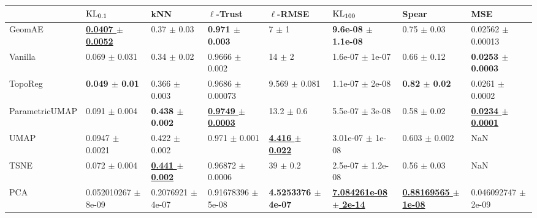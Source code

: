 \begin{tabular}{llllllll}
\toprule
{} &                               $\operatorname{KL}_{0.1}$ &                                      kNN &                               $\ell$-Trust &                              $\ell$-RMSE &                                    $\operatorname{KL}_{100}$ &                                         Spear &                                        MSE \\
\midrule
GeomAE         &   \underline{\textbf{0.0407 $\pm$ 0.0052}} &                          0.37 $\pm$ 0.03 &                 \textbf{0.971 $\pm$ 0.003} &                                7 $\pm$ 1 &                  \textbf{9.6e-08 $\pm$ 1.1e-08} &                               0.75 $\pm$ 0.03 &                      0.02562 $\pm$ 0.00013 \\
Vanilla        &                          0.069 $\pm$ 0.031 &                          0.34 $\pm$ 0.02 &                         0.9666 $\pm$ 0.002 &                               14 $\pm$ 2 &                             1.6e-07 $\pm$ 1e-07 &                               0.66 $\pm$ 0.12 &               \textbf{0.0253 $\pm$ 0.0003} \\
TopoReg        &                  \textbf{0.049 $\pm$ 0.01} &                        0.366 $\pm$ 0.003 &                       0.9686 $\pm$ 0.00073 &                        9.569 $\pm$ 0.081 &                             1.1e-07 $\pm$ 2e-08 &                      \textbf{0.82 $\pm$ 0.02} &                        0.0261 $\pm$ 0.0002 \\
ParametricUMAP &                          0.091 $\pm$ 0.004 &               \textbf{0.438 $\pm$ 0.002} &   \underline{\textbf{0.9749 $\pm$ 0.0003}} &                           13.2 $\pm$ 0.6 &                             5.5e-07 $\pm$ 3e-08 &                               0.58 $\pm$ 0.02 &   \underline{\textbf{0.0234 $\pm$ 0.0001}} \\
UMAP           &                        0.0947 $\pm$ 0.0021 &                        0.422 $\pm$ 0.002 &                          0.971 $\pm$ 0.001 &   \underline{\textbf{4.416 $\pm$ 0.022}} &                            3.01e-07 $\pm$ 1e-08 &                             0.603 $\pm$ 0.002 &                                        NaN \\
TSNE           &                          0.072 $\pm$ 0.004 &   \underline{\textbf{0.441 $\pm$ 0.002}} &                       0.96872 $\pm$ 0.0006 &                             39 $\pm$ 0.2 &                           2.5e-07 $\pm$ 1.2e-08 &                               0.56 $\pm$ 0.03 &                                        NaN \\
PCA            &                    0.052010267 $\pm$ 8e-09 &                    0.2076921 $\pm$ 4e-07 &                     0.91678396 $\pm$ 5e-08 &           \textbf{4.5253376 $\pm$ 4e-07} &   \underline{\textbf{7.084261e-08 $\pm$ 2e-14}} &   \underline{\textbf{0.88169565 $\pm$ 1e-08}} &                    0.046092747 $\pm$ 2e-09 \\
\bottomrule
\end{tabular}
